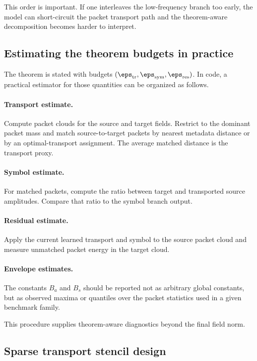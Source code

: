 This order is important. If one interleaves the low-frequency branch too early, the model can short-circuit the packet transport path and the theorem-aware decomposition becomes harder to interpret.

\subsection{Estimating the theorem budgets in practice}

The theorem is stated with budgets $(\eps_{\mathrm{tr}},\eps_{\mathrm{sym}},\eps_{\mathrm{res}})$. In code, a practical estimator for those quantities can be organized as follows.

\paragraph{Transport estimate.}
Compute packet clouds for the source and target fields. Restrict to the dominant packet mass and match source-to-target packets by nearest metadata distance or by an optimal-transport assignment. The average matched distance is the transport proxy.

\paragraph{Symbol estimate.}
For matched packets, compute the ratio between target and transported source amplitudes. Compare that ratio to the symbol branch output.

\paragraph{Residual estimate.}
Apply the current learned transport and symbol to the source packet cloud and measure unmatched packet energy in the target cloud.

\paragraph{Envelope estimates.}
The constants $B_a$ and $B_s$ should be reported not as arbitrary global constants, but as observed maxima or quantiles over the packet statistics used in a given benchmark family.

This procedure supplies theorem-aware diagnostics beyond the final field norm.

\subsection{Sparse transport stencil design}

